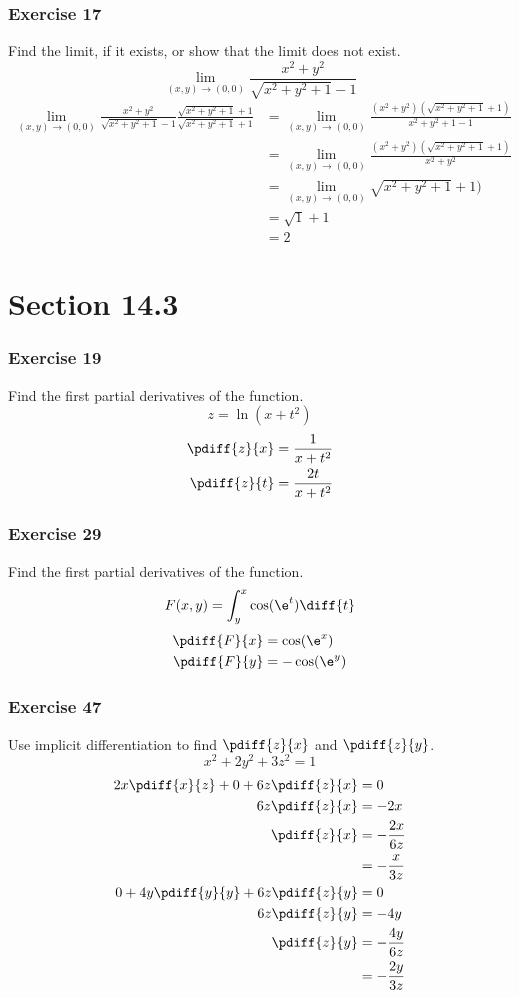 \documentclass{math}
\begin{document}
\subsubsection*{Exercise 17}
Find the limit, if it exists, or show that the limit does not exist.
\[ \lim_{(x,y)\to(0,0)}\frac{x^2+y^2}{\sqrt{x^2+y^2+1}-1} \]
\begin{align*}
  \lim_{(x,y)\to(0,0)}\frac{x^2+y^2}{\sqrt{x^2+y^2+1}-1}
    \frac{\sqrt{x^2+y^2+1}+1}{\sqrt{x^2+y^2+1}+1} &=
    \lim_{(x,y)\to(0,0)}\frac{(x^2+y^2)(\sqrt{x^2+y^2+1}+1)}{x^2+y^2+1-1} \\
  &= \lim_{(x,y)\to(0,0)}\frac{(x^2+y^2)(\sqrt{x^2+y^2+1}+1)}{x^2+y^2} \\
  &= \lim_{(x,y)\to(0,0)}\sqrt{x^2+y^2+1}+1) \\
  &= \sqrt{1}+1 \\
  &= 2
\end{align*}

\section*{Section 14.3}

\subsubsection*{Exercise 19}
Find the first partial derivatives of the function.
\[ z = \ln(x+t^2) \]
\begin{align*}
  \pdiff{z}{x} &= \frac{1}{x+t^2} \\
  \pdiff{z}{t} &= \frac{2t}{x+t^2}
\end{align*}

\subsubsection*{Exercise 29}
Find the first partial derivatives of the function.
\[ F(x,y) = \int_{y}^{x}\cos(\e^t)\diff{t} \]
\begin{align*}
  \pdiff{F}{x} &= \cos(\e^x) \\
  \pdiff{F}{y} &= -\cos(\e^y)
\end{align*}

\subsubsection*{Exercise 47}
Use implicit differentiation to find \( \pdiff{z}{x} \) and \( \pdiff{z}{y} \).
\[ x^2+2y^2+3z^2 = 1 \]
\begin{align*}
  2x\pdiff{x}{z}+0+6z\pdiff{z}{x} &= 0 \\
  6z\pdiff{z}{x} &= -2x \\
  \pdiff{z}{x} &= -\frac{2x}{6z} \\
  &= -\frac{x}{3z} \\
  0+4y\pdiff{y}{y}+6z\pdiff{z}{y} &= 0 \\
  6z\pdiff{z}{y} &= -4y \\
  \pdiff{z}{y} &= -\frac{4y}{6z} \\
  &= -\frac{2y}{3z}
\end{align*}
\end{document}
